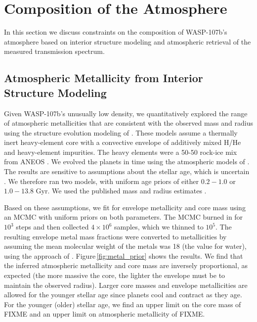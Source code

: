 \documentclass[twocolumn]{aastex61}
\begin{document}
\section{Composition of the Atmosphere}
In this section we discuss constraints on the composition of WASP-107b's atmosphere based on interior structure modeling and atmospheric retrieval of the measured transmission spectrum.

\subsection{Atmospheric Metallicity from Interior Structure Modeling}
\label{sec:interior}
Given WASP-107b's unusually low density, we quantitatively explored the range of atmospheric metallicities that are consistent with the observed mass and radius using the structure evolution modeling of \cite{thorngren16}.  These models assume a thermally inert heavy-element core with a convective envelope of additively mixed H/He \citep{saumon95} and heavy-element impurities.  The heavy elements were a 50-50 rock-ice mix from ANEOS \citep{thompson90}.  We evolved the planets in time using the atmospheric models of \cite{fortney07}.  The results are sensitive to assumptions about the stellar age, which is uncertain \citep[either $0.6\pm0.2$ to $8.3\pm4.3$ Gyr depending on model assumptions;][]{mocnik17}. We therefore ran two models, with uniform age priors of either $0.2-1.0$ or $1.0-13.8$ Gyr.  We used the published mass and radius estimates \citep[$0.12\pm0.01\,M_\mathrm{J}$, $0.94\pm0.02$;][]{anderson17}.  %

Based on these assumptions, we fit for envelope metallicity and core mass using an MCMC with uniform priors on both parameters.  The MCMC burned in for $10^3$ steps and then collected $4\times10^6$ samples, which we thinned to $10^5$.  The resulting envelope metal mass fractions were converted to metallicities by assuming the mean molecular weight of the metals was 18 (the value for water), using the approach of \cite{fortney13}. Figure\,\ref{fig:metal_prior} shows the results.  We find that the inferred atmospheric metallicity and core mass are inversely proportional, as expected (the more massive the core, the lighter the envelope must be to maintain the observed radius). Larger core masses and envelope metallicities are allowed for the younger stellar age since planets cool and contract as they age.  For the younger (older) stellar age, we find an upper limit on the core mass of FIXME and an upper limit on atmospheric metallicity of FIXME.
\end{document}
